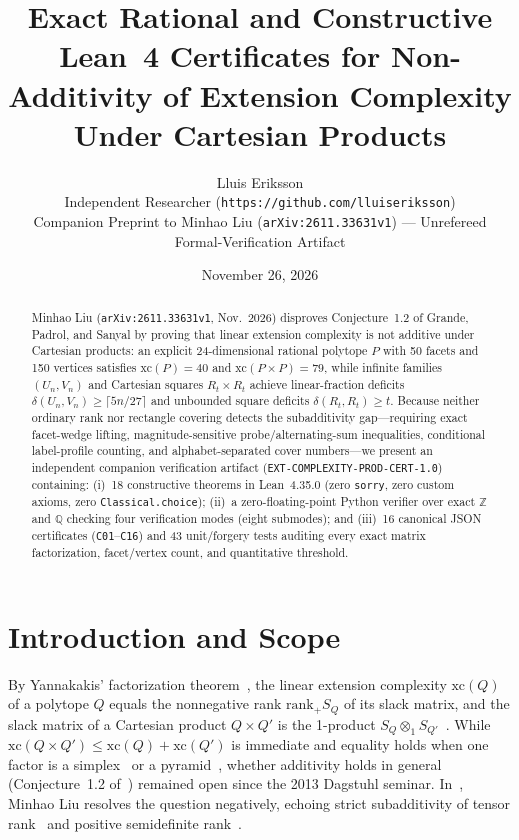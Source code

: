\documentclass[10pt,twocolumn]{article}
\title{\vspace{-1.2em}\textbf{Exact Rational and Constructive Lean~4 Certificates for Non-Additivity of Extension Complexity Under Cartesian Products}\vspace{-0.4em}}
\author{Lluis Eriksson\\
\small Independent Researcher (\nolinkurl{https://github.com/lluiseriksson})\\
\small Companion Preprint to Minhao Liu (\texttt{arXiv:2611.33631v1}) --- Unrefereed Formal-Verification Artifact\vspace{-0.6em}}
\date{November 26, 2026}
\begin{document}
\maketitle

\begin{abstract}
\noindent Minhao Liu (\texttt{arXiv:2611.33631v1}, Nov.~2026) disproves Conjecture~1.2 of Grande, Padrol, and Sanyal by proving that linear extension complexity is not additive under Cartesian products: an explicit 24-dimensional rational polytope $P$ with 50 facets and 150 vertices satisfies $\mathrm{xc}(P)=40$ and $\mathrm{xc}(P\times P)=79$, while infinite families $(U_n, V_n)$ and Cartesian squares $R_t \times R_t$ achieve linear-fraction deficits $\delta(U_n,V_n)\ge\lceil 5n/27\rceil$ and unbounded square deficits $\delta(R_t,R_t)\ge t$. Because neither ordinary rank nor rectangle covering detects the subadditivity gap---requiring exact facet-wedge lifting, magnitude-sensitive probe/alternating-sum inequalities, conditional label-profile counting, and alphabet-separated cover numbers---we present an independent companion verification artifact (\texttt{EXT-COMPLEXITY-PROD-CERT-1.0}) containing: (i)~18 constructive theorems in Lean~4.35.0 (zero \texttt{sorry}, zero custom axioms, zero \texttt{Classical.choice}); (ii)~a zero-floating-point Python verifier over exact $\mathbb{Z}$ and $\mathbb{Q}$ checking four verification modes (eight submodes); and (iii)~16 canonical JSON certificates (\texttt{C01}--\texttt{C16}) and 43 unit/forgery tests auditing every exact matrix factorization, facet/vertex count, and quantitative threshold.
\end{abstract}

\section{Introduction and Scope}
By Yannakakis' factorization theorem~\cite{Yannakakis1991}, the linear extension complexity $\mathrm{xc}(Q)$ of a polytope $Q$ equals the nonnegative rank $\mathrm{rank}_+ S_Q$ of its slack matrix, and the slack matrix of a Cartesian product $Q\times Q'$ is the 1-product $S_Q \otimes_1 S_{Q'}$~\cite{AprileEtAl2024,ConfortiCornuejolsZambelli2013}. While $\mathrm{xc}(Q\times Q') \le \mathrm{xc}(Q)+\mathrm{xc}(Q')$ is immediate and equality holds when one factor is a simplex~\cite{GrandePadrolSanyal2018} or a pyramid~\cite{TiwaryWeltgeZenklusen2017}, whether additivity holds in general (Conjecture~1.2 of~\cite{GrandePadrolSanyal2018}) remained open since the 2013 Dagstuhl seminar. In~\cite{Liu2026ExtensionComplexity}, Minhao Liu resolves the question negatively, echoing strict subadditivity of tensor rank~\cite{Shitov2019} and positive semidefinite rank~\cite{GouveiaRobinsonThomas2013}.
\end{document}
